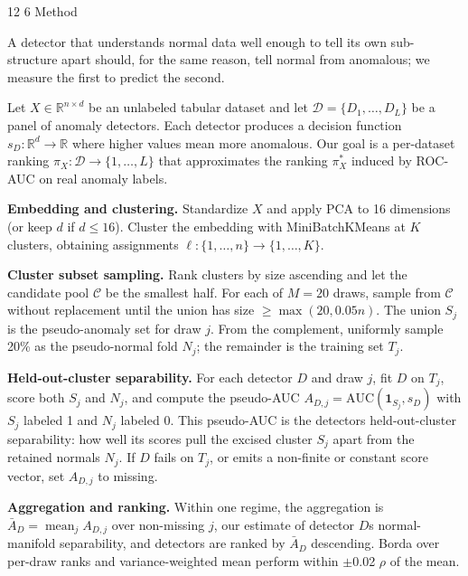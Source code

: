 \documentclass[3p,twocolumn]{elsarticle}
\makeatletter
\renewcommand\section{\@startsection{section}{1}{\z@}%
           {12\p@ \@plus 4\p@ \@minus 4\p@}%
           {6\p@ \@plus 4\p@ \@minus 3\p@}%
           {\normalsize\bfseries\boldmath}}
\makeatother
\begin{document}
\section{Method}\label{3-method}

A detector that understands normal data well enough to tell its own sub-structure apart should, for the same reason, tell normal from anomalous; we measure the first to predict the second.

Let \(X \in \mathbb{R}^{n \times d}\) be an unlabeled tabular dataset and let \(\mathcal{D} = \{D_1, \dots, D_L\}\) be a panel of anomaly detectors. Each detector produces a decision function \(s_D: \mathbb{R}^d \to \mathbb{R}\) where higher values mean more anomalous. Our goal is a per-dataset ranking \(\pi_X: \mathcal{D} \to \{1, \dots, L\}\) that approximates the ranking \(\pi_X^*\) induced by ROC-AUC on real anomaly labels.

\textbf{Embedding and clustering.} Standardize \(X\) and apply PCA to 16 dimensions (or keep \(d\) if \(d \le 16\)). Cluster the embedding with MiniBatchKMeans at \(K\) clusters, obtaining assignments \(\ell : \{1, \dots, n\} \to \{1, \dots, K\}\).

\textbf{Cluster subset sampling.} Rank clusters by size ascending and let the candidate pool \(\mathcal{C}\) be the smallest half. For each of \(M = 20\) draws, sample from \(\mathcal{C}\) without replacement until the union has size \(\ge \max(20, 0.05 n)\). The union \(S_j\) is the pseudo-anomaly set for draw \(j\). From the complement, uniformly sample 20\% as the pseudo-normal fold \(N_j\); the remainder is the training set \(T_j\).

\textbf{Held-out-cluster separability.} For each detector \(D\) and draw \(j\), fit \(D\) on \(T_j\), score both \(S_j\) and \(N_j\), and compute the pseudo-AUC \(A_{D,j} = \mathrm{AUC}(\mathbf{1}_{S_j}, s_D)\) with \(S_j\) labeled 1 and \(N_j\) labeled 0. This pseudo-AUC is the detector\textquotesingle s held-out-cluster separability: how well its scores pull the excised cluster \(S_j\) apart from the retained normals \(N_j\). If \(D\) fails on \(T_j\), or emits a non-finite or constant score vector, set \(A_{D,j}\) to missing.

\textbf{Aggregation and ranking.} Within one regime, the aggregation is \(\bar A_D = \operatorname{mean}_j A_{D,j}\) over non-missing \(j\), our estimate of detector \(D\)\textquotesingle s normal-manifold separability, and detectors are ranked by \(\bar A_D\) descending. Borda over per-draw ranks and variance-weighted mean perform within $\pm$0.02 $\rho$ of the mean.
\end{document}
